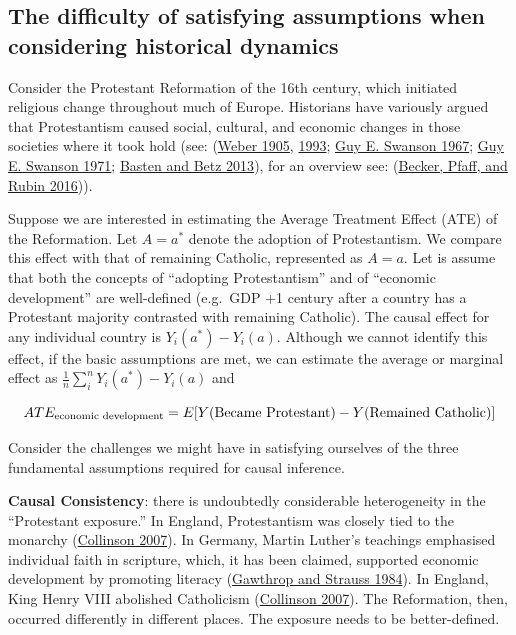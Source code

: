 \documentclass[
  singlecolumn]{report}
\begin{document}
\hypertarget{the-difficulty-of-satisfying-assumptions-when-considering-historical-dynamics}{%
\subsection{The difficulty of satisfying assumptions when considering
historical
dynamics}\label{the-difficulty-of-satisfying-assumptions-when-considering-historical-dynamics}}

Consider the Protestant Reformation of the 16th century, which initiated
religious change throughout much of Europe. Historians have variously
argued that Protestantism caused social, cultural, and economic changes
in those societies where it took hold (see:
(\protect\hyperlink{ref-weber1905}{Weber 1905},
\protect\hyperlink{ref-weber1993}{1993};
\protect\hyperlink{ref-swanson1967}{Guy E. Swanson 1967};
\protect\hyperlink{ref-swanson1971}{Guy E. Swanson 1971};
\protect\hyperlink{ref-basten2013}{Basten and Betz 2013}), for an
overview see: (\protect\hyperlink{ref-becker2016}{Becker, Pfaff, and
Rubin 2016})).

Suppose we are interested in estimating the Average Treatment Effect
(ATE) of the Reformation. Let \(A = a^*\) denote the adoption of
Protestantism. We compare this effect with that of remaining Catholic,
represented as \(A = a\). Let is assume that both the concepts of
``adopting Protestantism'' and of ``economic development'' are
well-defined (e.g.~GDP +1 century after a country has a Protestant
majority contrasted with remaining Catholic). The causal effect for any
individual country is \(Y_i(a^*) - Y_i(a)\). Although we cannot identify
this effect, if the basic assumptions are met, we can estimate the
average or marginal effect as
\(\frac{1}{n} \sum_i^{n} Y_i(a^*) - Y_i(a)\) and

\[ATE_{\textnormal{economic~development}} = E[Y(\textnormal{Became~Protestant}) - Y(\textnormal{Remained~Catholic})]\]

Consider the challenges we might have in satisfying ourselves of the
three fundamental assumptions required for causal inference.

\textbf{Causal Consistency}: there is undoubtedly considerable
heterogeneity in the ``Protestant exposure.'' In England, Protestantism
was closely tied to the monarchy
(\protect\hyperlink{ref-collinson2007}{Collinson 2007}). In Germany,
Martin Luther's teachings emphasised individual faith in scripture,
which, it has been claimed, supported economic development by promoting
literacy (\protect\hyperlink{ref-gawthrop1984}{Gawthrop and Strauss
1984}). In England, King Henry VIII abolished Catholicism
(\protect\hyperlink{ref-collinson2007}{Collinson 2007}). The
Reformation, then, occurred differently in different places. The
exposure needs to be better-defined.
\end{document}

